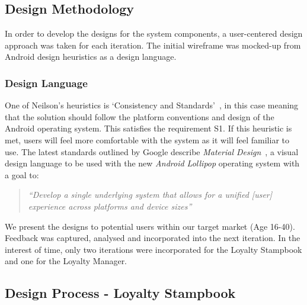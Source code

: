 \subsection{Design Methodology}
In order to develop the designs for the system components, a user-centered design\cite{usercentereddesign} approach was taken for each iteration. The initial wireframe was mocked-up from Android design heuristics as a design language.
\subsubsection{Design Language}
One of Neilson's heuristics is `Consistency and Standards'~\cite{jakob}, in this case meaning that the solution should follow the platform conventions and design of the Android operating system. This satisfies the requirement S1. If this heuristic is met, users will feel more comfortable with the system as it will feel familiar to use. The latest standards outlined by Google describe \emph{Material Design}~\cite{materialDesign}, a visual design language to be used with the new \emph{Android Lollipop} operating system with a goal to:
\begin{quote}
    \textit{``Develop a single underlying system that allows for a unified [user] experience across platforms and device sizes''}~\cite[Introduction]{materialDesign}
\end{quote}

We present the designs to potential users within our target market (Age 16-40). Feedback was captured, analysed and incorporated into the next iteration. In the interest of time, only two iterations were incorporated for the Loyalty Stampbook and one for the Loyalty Manager.

\newpage{}
\subsection{Design Process - Loyalty Stampbook}
